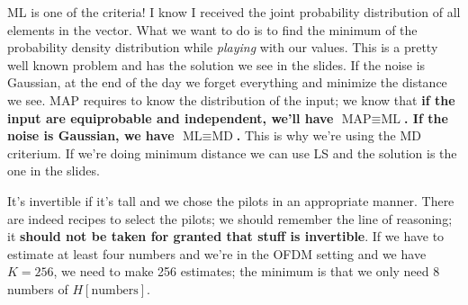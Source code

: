 \documentclass[a4paper, 12pt]{book}
\begin{document}
\noindent\color{orange}\color{black}


\noindent\color{gray}\color{black}

ML is one of the criteria!
I know I received the joint probability distribution of all elements in the vector.
What we want to do is to find the minimum of the probability density distribution while \textit{playing} with our values.
This is a pretty well known problem and has the solution we see in the slides.
If the noise is Gaussian, at the end of the day we forget everything and minimize the distance we see.
MAP requires to know the distribution of the input; we know that \textbf{if the input are equiprobable and independent, we'll have $\text{MAP} \equiv \text{ML}$. If the noise is Gaussian, we have $\text{ML} \equiv \text{MD}$.} This is why we're using the MD criterium. If we're doing minimum distance we can use LS and the solution is the one in the slides.

It's invertible if it's tall and we chose the pilots in an appropriate manner.
There are indeed recipes to select the pilots; we should remember the line of reasoning; it \textbf{should not be taken for granted that stuff is invertible}.
If we have to estimate at least four numbers and we're in the OFDM setting and we have $K=256$, we need to make 256 estimates; the minimum is that we only need 8 numbers of $H[\text{numbers}]$.
\end{document}
